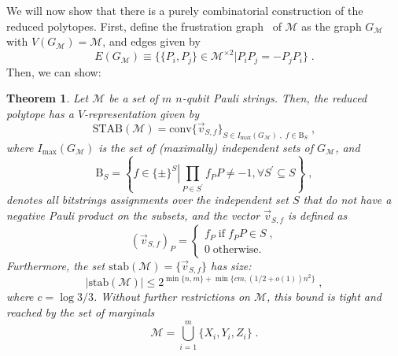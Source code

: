 \documentclass[10pt,aps,pra,twocolumn,floatfix,nofootinbib,superscriptaddress,longbibliography]{revtex4-2}
\newcommand{\1}{\mathbbm{1}}
\newtheorem{thm}{Theorem}
\begin{document}
We will now show that there is a purely combinatorial construction of the reduced polytopes. First, define the frustration graph~\cite{gokhale2019minimizing,chapman2020characterization,mann2025graph,xu2025simultaneous} of $\mathcal M$ as the graph $G_\mathcal M$ with $V(G_\mathcal M) =\mathcal M$, and edges given by
\begin{equation}
    E(G_\mathcal M) \equiv \{\{P_i, P_j\} \in \mathcal M^{\times 2}| P_i P_j=-P_jP_i\}\;.
\end{equation}
Then, we can show:
\begin{thm}
    Let $\mathcal M$ be a set of $m$ $n$-qubit Pauli strings. Then, the reduced polytope has a $V$-representation given by
    \begin{equation}
        \mathrm{STAB}(\mathcal M) = \mathrm{conv}\{\vec v_{S,f}\}_{S \in I_\mathrm{max}(G_\mathcal M)\;,\;f \in \mathrm B_S}\;,
        \label{eq:reducedstabindependentsetss}
    \end{equation}
    where $I_\mathrm{max}(G_\mathcal M)$ is the set of (maximally) independent sets of $G_\mathcal M$, and
    \begin{equation}
        \mathrm B_S =\left\{\left .f \in \{\pm\}^S\right| \prod_{P \in S^\prime} {f_P} P\neq -1, \forall S^\prime \subseteq S\right\}\;,
        \label{admissiblef}
    \end{equation}
    denotes all bitstrings assignments over the independent set $S$ that do not have a negative Pauli product on the subsets, and the vector $\vec v_{S,f}$ is defined as
    \begin{equation}
    (\vec  v_{S,f})_P =  
    \begin{cases}
f_P \; \mathrm{if\;} f_PP \in S\;,\\
0\;\mathrm{otherwise.}
    \end{cases}
    \label{eq:consistentvector}
    \end{equation}
    Furthermore, the set $\mathrm{stab}(\mathcal M) =\{\vec{v}_{S,f}\}$ has size:
    \begin{equation}
        |\mathrm{stab}(\mathcal M)| \leq 2^{\min\{n,m\}+\min\{cm,(1/2+o(1))n^2\}}\;,
        \label{eq:upperboundreducedstab}
    \end{equation}
     where $c=\log 3/3$. Without further restrictions on $\mathcal{M}$, this bound is tight and reached by the set of marginals
     \begin{equation}
         \mathcal M= \bigcup_{i=1}^m \{X_i,Y_i,Z_i\}\;.
     \end{equation}
     \label{thm:reducedstabdecomp}
\end{thm}
\end{document}
